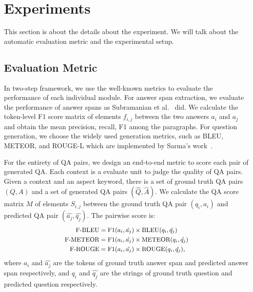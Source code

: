 \section{Experiments}
\label{sec:eval}
This section is about the details about the experiment.
We will talk about the automatic evaluation metric
and
the experimental setup.

\subsection{Evaluation Metric}
\label{sec:metric}
In two-step framework, we use the well-known metrics to evaluate the performance of each individual module.
For answer span extraction, we evaluate the performance of answer spans as Subramanian et al.~ did. 
We calculate the token-level F1 score matrix of elements $f_{i,j}$ between the two answers $a_i$ and $a_j$ and obtain the mean precision, recall, F1 among the paragraphs.
For question generation, we choose the widely used generation metrics, such as BLEU, METEOR, and ROUGE-L which are implemented by Sarma's work~\cite{sharma2017relevance}.

For the entirety of QA pairs, we design an end-to-end metric to score each pair of generated QA.
Each context is a evaluate unit to judge the quality of QA pairs.
Given a context and an aspect keyword, there is a set of ground truth QA pairs $(Q, A)$ and a set of generated QA pairs $(\hat{Q}, \hat{A})$.
We calculate the QA score matrix $M$ of elements $S_{i,j}$ between the ground truth QA pair $(q_i, a_i)$ and predicted QA pair $(\hat{a_j}, \hat{q_j})$.
The pairwise score is:
\begin{equation*}
\small
\begin{aligned}
\text{F-BLEU} &= \text{F}1(a_i, \hat{a_j})\times \text{BLEU}(q_i, \hat{q_j})\\
\text{F-METEOR} &=\text{F}1(a_i, \hat{a_j})\times \text{METEOR}(q_i, \hat{q_j})\\
\text{F-ROUGE} &= \text{F}1(a_i, \hat{a_j})\times \text{ROUGE}(q_i, \hat{q_j}),
\end{aligned}
\end{equation*}
where $a_i$ and $\hat{a_j}$ are the tokens of ground truth answer span and predicted answer span respectively, and $q_i$ and $\hat{q_j}$ are the strings of ground truth question and predicted question respectively.

